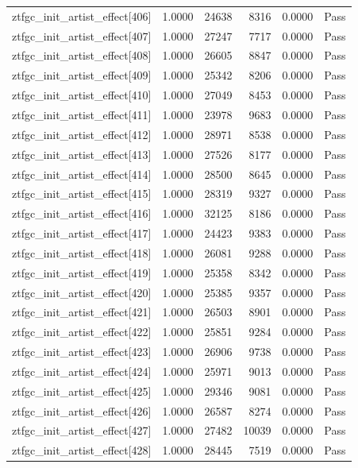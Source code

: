 \begin{table}[htbp]
\begin{tabular}{llrrll}
ztfgc\_init\_artist\_effect[406] & 1.0000 & 24638 & 8316 & 0.0000 & Pass \\
ztfgc\_init\_artist\_effect[407] & 1.0000 & 27247 & 7717 & 0.0000 & Pass \\
ztfgc\_init\_artist\_effect[408] & 1.0000 & 26605 & 8847 & 0.0000 & Pass \\
ztfgc\_init\_artist\_effect[409] & 1.0000 & 25342 & 8206 & 0.0000 & Pass \\
ztfgc\_init\_artist\_effect[410] & 1.0000 & 27049 & 8453 & 0.0000 & Pass \\
ztfgc\_init\_artist\_effect[411] & 1.0000 & 23978 & 9683 & 0.0000 & Pass \\
ztfgc\_init\_artist\_effect[412] & 1.0000 & 28971 & 8538 & 0.0000 & Pass \\
ztfgc\_init\_artist\_effect[413] & 1.0000 & 27526 & 8177 & 0.0000 & Pass \\
ztfgc\_init\_artist\_effect[414] & 1.0000 & 28500 & 8645 & 0.0000 & Pass \\
ztfgc\_init\_artist\_effect[415] & 1.0000 & 28319 & 9327 & 0.0000 & Pass \\
ztfgc\_init\_artist\_effect[416] & 1.0000 & 32125 & 8186 & 0.0000 & Pass \\
ztfgc\_init\_artist\_effect[417] & 1.0000 & 24423 & 9383 & 0.0000 & Pass \\
ztfgc\_init\_artist\_effect[418] & 1.0000 & 26081 & 9288 & 0.0000 & Pass \\
ztfgc\_init\_artist\_effect[419] & 1.0000 & 25358 & 8342 & 0.0000 & Pass \\
ztfgc\_init\_artist\_effect[420] & 1.0000 & 25385 & 9357 & 0.0000 & Pass \\
ztfgc\_init\_artist\_effect[421] & 1.0000 & 26503 & 8901 & 0.0000 & Pass \\
ztfgc\_init\_artist\_effect[422] & 1.0000 & 25851 & 9284 & 0.0000 & Pass \\
ztfgc\_init\_artist\_effect[423] & 1.0000 & 26906 & 9738 & 0.0000 & Pass \\
ztfgc\_init\_artist\_effect[424] & 1.0000 & 25971 & 9013 & 0.0000 & Pass \\
ztfgc\_init\_artist\_effect[425] & 1.0000 & 29346 & 9081 & 0.0000 & Pass \\
ztfgc\_init\_artist\_effect[426] & 1.0000 & 26587 & 8274 & 0.0000 & Pass \\
ztfgc\_init\_artist\_effect[427] & 1.0000 & 27482 & 10039 & 0.0000 & Pass \\
ztfgc\_init\_artist\_effect[428] & 1.0000 & 28445 & 7519 & 0.0000 & Pass \\

\end{tabular}
\end{table}
